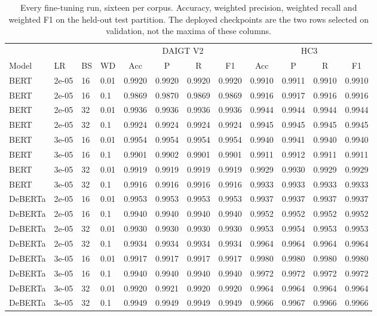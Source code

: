 \documentclass[conference,a4paper]{IEEEtran}
\begin{document}
\begin{table}[!t]
\centering
\caption{Every fine-tuning run, sixteen per corpus. Accuracy, weighted precision, weighted recall and weighted F1 on the held-out test partition. The deployed checkpoints are the two rows selected on validation, not the maxima of these columns.}
\label{tab:transformers}
\scriptsize
\setlength{\tabcolsep}{2.6pt}
\begin{tabular}{@{}llll cccc cccc@{}}
\toprule
& & & & \multicolumn{4}{c}{DAIGT V2} & \multicolumn{4}{c}{HC3} \\
\cmidrule(lr){5-8}\cmidrule(lr){9-12}
Model & LR & BS & WD & Acc & P & R & F1 & Acc & P & R & F1 \\
\midrule
BERT & 2e-05 & 16 & 0.01 & 0.9920 & 0.9920 & 0.9920 & 0.9920 & 0.9910 & 0.9911 & 0.9910 & 0.9910 \\
BERT & 2e-05 & 16 & 0.1 & 0.9869 & 0.9870 & 0.9869 & 0.9869 & 0.9916 & 0.9917 & 0.9916 & 0.9916 \\
BERT & 2e-05 & 32 & 0.01 & 0.9936 & 0.9936 & 0.9936 & 0.9936 & 0.9944 & 0.9944 & 0.9944 & 0.9944 \\
BERT & 2e-05 & 32 & 0.1 & 0.9924 & 0.9924 & 0.9924 & 0.9924 & 0.9945 & 0.9945 & 0.9945 & 0.9945 \\
BERT & 3e-05 & 16 & 0.01 & 0.9954 & 0.9954 & 0.9954 & 0.9954 & 0.9940 & 0.9941 & 0.9940 & 0.9940 \\
BERT & 3e-05 & 16 & 0.1 & 0.9901 & 0.9902 & 0.9901 & 0.9901 & 0.9911 & 0.9912 & 0.9911 & 0.9911 \\
BERT & 3e-05 & 32 & 0.01 & 0.9919 & 0.9919 & 0.9919 & 0.9919 & 0.9929 & 0.9930 & 0.9929 & 0.9929 \\
BERT & 3e-05 & 32 & 0.1 & 0.9916 & 0.9916 & 0.9916 & 0.9916 & 0.9933 & 0.9933 & 0.9933 & 0.9933 \\
DeBERTa & 2e-05 & 16 & 0.01 & 0.9953 & 0.9953 & 0.9953 & 0.9953 & 0.9937 & 0.9937 & 0.9937 & 0.9937 \\
DeBERTa & 2e-05 & 16 & 0.1 & 0.9940 & 0.9940 & 0.9940 & 0.9940 & 0.9952 & 0.9952 & 0.9952 & 0.9952 \\
DeBERTa & 2e-05 & 32 & 0.01 & 0.9930 & 0.9930 & 0.9930 & 0.9930 & 0.9953 & 0.9954 & 0.9953 & 0.9953 \\
DeBERTa & 2e-05 & 32 & 0.1 & 0.9934 & 0.9934 & 0.9934 & 0.9934 & 0.9964 & 0.9964 & 0.9964 & 0.9964 \\
DeBERTa & 3e-05 & 16 & 0.01 & 0.9917 & 0.9917 & 0.9917 & 0.9917 & 0.9980 & 0.9980 & 0.9980 & 0.9980 \\
DeBERTa & 3e-05 & 16 & 0.1 & 0.9940 & 0.9940 & 0.9940 & 0.9940 & 0.9972 & 0.9972 & 0.9972 & 0.9972 \\
DeBERTa & 3e-05 & 32 & 0.01 & 0.9920 & 0.9921 & 0.9920 & 0.9920 & 0.9964 & 0.9964 & 0.9964 & 0.9964 \\
DeBERTa & 3e-05 & 32 & 0.1 & 0.9949 & 0.9949 & 0.9949 & 0.9949 & 0.9966 & 0.9967 & 0.9966 & 0.9966 \\
\bottomrule
\end{tabular}
\end{table}
\end{document}
